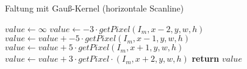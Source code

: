 \begin{algorithm}
	\caption{Faltung mit Gauß-Kernel (horizontale Scanline)}
	\label{src:analyseConvolution}
	\begin{algorithmic}[1]
		\State $value \gets \infty$
		\State $value \gets -3 \cdot getPixel(I_m, x - 2, y, w, h)$
		\State $value \gets value + -5 \cdot getPixel(I_m, x - 1, y, w, h)$
		\State $value \gets value + 5 \cdot getPixel(I_m, x + 1, y, w, h)$
		\State $value \gets value + 3 \cdot getPixel\cdot(I_m, x + 2, y, w, h)$
		\State \textbf{return} $value$
		\EndProcedure
	\end{algorithmic}
\end{algorithm}
